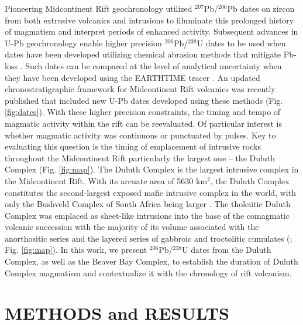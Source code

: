 \documentclass[11pt,letterpaper]{article}
\begin{document}
Pioneering Midcontinent Rift geochronology utilized $^{207}$Pb/$^{206}$Pb dates on zircon from both extrusive volcanics \citep{Davis1997a} and intrusions \citep{Paces1993a} to illuminate this prolonged history of magmatism and interpret periods of enhanced activity. Subsequent advances in U-Pb geochronology enable higher precision $^{206}$Pb/$^{238}$U dates to be used when dates have been developed utilizing chemical abrasion methods that mitigate Pb-loss \citep{Mattinson2005a}. Such dates can be compared at the level of analytical uncertainty when they have been developed using the EARTHTIME tracer \citep{Condon2015a}. An updated chronostratigraphic framework for Midcontinent Rift volcanics was recently published \citep{Swanson-Hysell2019a} that included new U-Pb dates developed using these methods (Fig. \ref{fig:dates}). With these higher precision constraints, the timing and tempo of magmatic activity within the rift can be reevaluated. Of particular interest is whether magmatic activity was continuous or punctuated by pulses. Key to evaluating this question is the timing of emplacement of intrusive rocks throughout the Midcontinent Rift particularly the largest one -- the Duluth Complex (Fig. \ref{fig:map}). The Duluth Complex is the largest intrusive complex in the Midcontinent Rift. With its arcuate area of 5630 km$^2$, the Duluth Complex constitutes the second-largest exposed mafic intrusive complex in the world, with only the Bushveld Complex of South Africa being larger \citep{Miller2002c}. The tholeiitic Duluth Complex was emplaced as sheet-like intrusions into the base of the comagmatic volcanic succession with the majority of its volume associated with the anorthositic series and the layered series of gabbroic and troctolitic cumulates (\citealp{Miller2002c}; Fig. \ref{fig:map}). In this work, we present $^{206}$Pb/$^{238}$U dates from the Duluth Complex, as well as the Beaver Bay Complex, to establish the duration of Duluth Complex magmatism and contextualize it with the chronology of rift volcanism.

\section*{METHODS and RESULTS}
\end{document}
